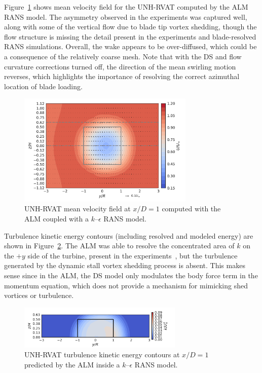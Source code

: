 \documentclass[times]{weauth}
\begin{document}
Figure~\ref{fig:RVAT-ALM-meancontquiv} shows mean velocity field for the
UNH-RVAT computed by the ALM RANS model. The asymmetry observed in the
experiments \cite{Bachant2015-JoT} was captured well, along with some of the
vertical flow due to blade tip vortex shedding, though the flow structure is
missing the detail present in the experiments and blade-resolved RANS
simulations. Overall, the wake appears to be over-diffused, which could be a
consequence of the relatively coarse mesh. Note that with the DS and flow
curvature corrections turned off, the direction of the mean swirling motion
reverses, which highlights the importance of resolving the correct azimuthal
location of blade loading.

\begin{figure}
    \centering

    \includegraphics[width=0.75\textwidth]{RVAT-ALM_meancontquiv}

    \caption{UNH-RVAT mean velocity field at $x/D=1$ computed with the ALM
        coupled with a $k$--$\epsilon$ RANS model.}

    \label{fig:RVAT-ALM-meancontquiv}
\end{figure}

Turbulence kinetic energy contours (including resolved and modeled energy) are
shown in Figure~\ref{fig:RVAT-ALM-kcont}. The ALM was able to resolve the
concentrated area of $k$ on the $+y$ side of the turbine, present in the
experiments~\cite{Bachant2015-JoT}, but the turbulence generated by the dynamic
stall vortex shedding process is absent. This makes sense since in the ALM, the
DS model only modulates the body force term in the momentum equation, which does
not provide a mechanism for mimicking shed vortices or turbulence.

\begin{figure}
    \centering

    \includegraphics[width=0.7\textwidth]{RVAT-ALM_kcont}

    \caption{UNH-RVAT turbulence kinetic energy contours at $x/D=1$ predicted by
        the ALM inside a $k$--$\epsilon$ RANS model.}

    \label{fig:RVAT-ALM-kcont}
\end{figure}
\end{document}
